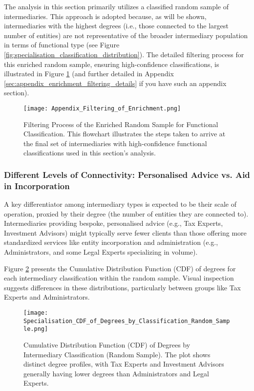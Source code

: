 The analysis in this section primarily utilizes a classified random sample of intermediaries. This approach is adopted because, as will be shown, intermediaries with the highest degrees (i.e., those connected to the largest number of entities) are not representative of the broader intermediary population in terms of functional type (see Figure \ref{fig:specialisation_classification_distribution}). The detailed filtering process for this enriched random sample, ensuring high-confidence classifications, is illustrated in Figure \ref{fig:appendix_filtering_enrichment} (and further detailed in Appendix \ref{sec:appendix_enrichment_filtering_details} if you have such an appendix section).

\begin{figure}[htbp]
    \centering
    \texttt{[image: Appendix\_Filtering\_of\_Enrichment.png]}
    \caption{Filtering Process of the Enriched Random Sample for Functional Classification. This flowchart illustrates the steps taken to arrive at the final set of intermediaries with high-confidence functional classifications used in this section's analysis.}
    \label{fig:appendix_filtering_enrichment}
\end{figure}

\subsubsection{Different Levels of Connectivity: Personalised Advice vs. Aid in Incorporation}
\label{subsubsec:connectivity_functional}

A key differentiator among intermediary types is expected to be their scale of operation, proxied by their degree (the number of entities they are connected to). Intermediaries providing bespoke, personalised advice (e.g., Tax Experts, Investment Advisors) might typically serve fewer clients than those offering more standardized services like entity incorporation and administration (e.g., Administrators, and some Legal Experts specializing in volume).

Figure \ref{fig:specialisation_cdf_degrees} presents the Cumulative Distribution Function (CDF) of degrees for each intermediary classification within the random sample. Visual inspection suggests differences in these distributions, particularly between groups like Tax Experts and Administrators.

\begin{figure}[htbp]
    \centering
    \texttt{[image: Specialisation\_CDF\_of\_Degrees\_by\_Classification\_Random\_Sample.png]}
    \caption{Cumulative Distribution Function (CDF) of Degrees by Intermediary Classification (Random Sample). The plot shows distinct degree profiles, with Tax Experts and Investment Advisors generally having lower degrees than Administrators and Legal Experts.}
    \label{fig:specialisation_cdf_degrees}
\end{figure}

